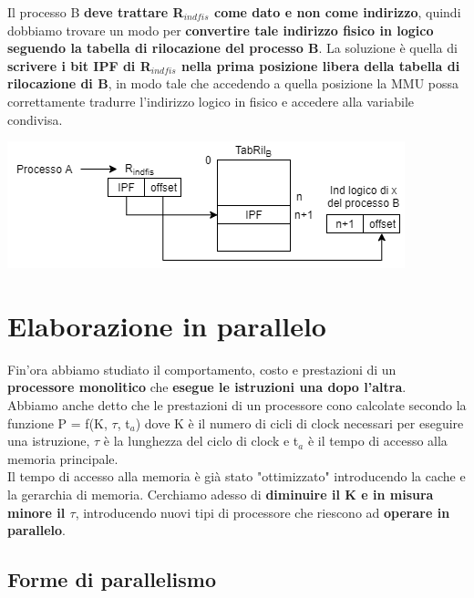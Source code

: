 \documentclass[10pt]{report}
\begin{document}
Il processo B \textbf{deve trattare R$_{indfis}$ come dato e non come indirizzo}, quindi dobbiamo trovare un modo per \textbf{convertire tale indirizzo fisico in logico seguendo la tabella di rilocazione del processo B}. La soluzione è quella di \textbf{scrivere i bit IPF di R$_{indfis}$ nella prima posizione libera della tabella di rilocazione di B}, in modo tale che accedendo a quella posizione la MMU possa correttamente tradurre l'indirizzo logico in fisico e accedere alla variabile condivisa.
\begin{center}
	\includegraphics[scale=0.75]{indcondivisi.png}
\end{center}
\pagebreak
\chapter{Elaborazione in parallelo}
Fin'ora abbiamo studiato il comportamento, costo e prestazioni di un \textbf{processore monolitico} che \textbf{esegue le istruzioni una dopo l'altra}.\\
Abbiamo anche detto che le prestazioni di un processore cono calcolate secondo la funzione P = f(K, $\tau$, t$_a$) dove K è il numero di cicli di clock necessari per eseguire una istruzione, $\tau$ è la lunghezza del ciclo di clock e t$_a$ è il tempo di accesso alla memoria principale.\\
Il tempo di accesso alla memoria è già stato "ottimizzato" introducendo la cache e la gerarchia di memoria. Cerchiamo adesso di \textbf{diminuire il K e in misura minore il $\tau$}, introducendo nuovi tipi di processore che riescono ad \textbf{operare in parallelo}.
\section{Forme di parallelismo}
\end{document}
